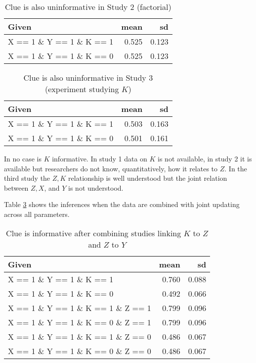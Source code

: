 \documentclass[
  12pt,
]{book}
\begin{document}
\begin{table}

\caption{\label{tab:frank2}Clue is also uninformative in Study 2 (factorial)}
\centering
\begin{tabular}[t]{l|r|r}
\hline
Given & mean & sd\\
\hline
X == 1 \& Y == 1 \& K == 1 & 0.525 & 0.123\\
\hline
X == 1 \& Y == 1 \& K == 0 & 0.525 & 0.123\\
\hline
\end{tabular}
\end{table}

\begin{table}

\caption{\label{tab:frank3}Clue is also uninformative in Study 3 (experiment studying $K$)}
\centering
\begin{tabular}[t]{l|r|r}
\hline
Given & mean & sd\\
\hline
X == 1 \& Y == 1 \& K == 1 & 0.503 & 0.163\\
\hline
X == 1 \& Y == 1 \& K == 0 & 0.501 & 0.161\\
\hline
\end{tabular}
\end{table}

In no case is \(K\) informative. In study 1 data on \(K\) is not available, in study 2 it is available but researchers do not know, quantitatively, how it relates to \(Z\). In the third study the \(Z,K\) relationship is well understood but the joint relation between \(Z,X\), and \(Y\) is not understood.

Table \ref{tab:frank4} shows the inferences when the data are combined with joint updating across all parameters.

\begin{table}

\caption{\label{tab:frank4}Clue is informative after combining studies linking $K$ to $Z$ and $Z$ to $Y$}
\centering
\begin{tabular}[t]{l|r|r}
\hline
Given & mean & sd\\
\hline
X == 1 \& Y == 1 \& K == 1 & 0.760 & 0.088\\
\hline
X == 1 \& Y == 1 \& K == 0 & 0.492 & 0.066\\
\hline
X == 1 \& Y == 1 \& K == 1 \& Z == 1 & 0.799 & 0.096\\
\hline
X == 1 \& Y == 1 \& K == 0 \& Z == 1 & 0.799 & 0.096\\
\hline
X == 1 \& Y == 1 \& K == 1 \& Z == 0 & 0.486 & 0.067\\
\hline
X == 1 \& Y == 1 \& K == 0 \& Z == 0 & 0.486 & 0.067\\
\hline
\end{tabular}
\end{table}
\end{document}
